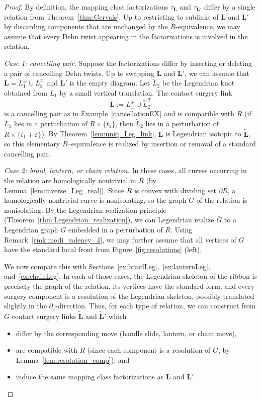 \documentclass{amsart}
\numberwithin{equation}{section}
\numberwithin{figure}{section}
\theoremstyle{definition}
\theoremstyle{remark}
\let\oldtau\tau
\renewcommand{\tau}{\oldtau}
\begin{document}
\begin{proof}
  By definition, the mapping class factorizations $\tau_{\scriptscriptstyle{\boldsymbol{L}}}$ and $\tau_{\scriptscriptstyle{\boldsymbol{L}'}}$ differ by a single relation from Theorem~\ref{thm:Gervais}. Up to restricting to sublinks of $\boldsymbol{L}$ and $\boldsymbol{L}'$ by discarding components that are unchanged by the $R$-equivalence, we may assume that every Dehn twist appearing in the factorizations is involved in the relation.

  \medskip\noindent
  \emph{Case 1: cancelling pair.}  
  Suppose the factorizations differ by inserting or deleting a pair of cancelling Dehn twists. Up to swapping $\boldsymbol{L}$ and $\boldsymbol{L}'$, we can assume that $\boldsymbol{L}=L_1^{\pm}\cup L_2^{\mp}$ and $\boldsymbol{L}'$ is the empty diagram.
Let $\widetilde{L}_2$ be the Legendrian knot obtained from $L_1$ by a small vertical translation. The contact surgery link
  \[
    \widetilde{\boldsymbol{L}} := L_1^{\pm}\cup \widetilde{L}_2^{\mp}
  \]
  is a cancelling pair as in Example~\ref{cancellationEX} and is compatible with $R$ (if $L_1$ lies in a perturbation of $R\times\{t_1\}$, then $\widetilde{L}_2$ lies in a perturbation of $R\times\{t_1+\varepsilon\}$). By Theorem~\ref{lem:uniq_Leg_link}, $\boldsymbol{L}$ is Legendrian isotopic to $\widetilde{\boldsymbol{L}}$, so this elementary $R$–equivalence is realized by insertion or removal of a standard cancelling pair.

  \medskip\noindent
  \emph{Case 2: braid, lantern, or chain relation.}  
  In these cases, all curves occurring in the relation are homologically nontrivial in $R$ (by Lemma~\ref{lem:inverse_Leg_real}). Since $R$ is convex with dividing set $\partial R$, a homologically nontrivial curve is nonisolating, so the graph $\overline{G}$ of the relation is nonisolating.  
  By the Legendrian realization principle (Theorem~\ref{thm:Legendrian_realization}), we can Legendrian realize $\overline{G}$ to a Legendrian graph $G$ embedded in a perturbation of $R$. Using Remark~\ref{rmk:modi_valency_4}, we may further assume that all vertices of $G$ have the standard local front from Figure~\ref{fig:resolutions} (left).

  We now compare this with Sections~\ref{ex:braidLeg},~\ref{ex:lanternLeg}, and~\ref{ex:chainLeg}. In each of those cases, the Legendrian skeleton of the ribbon is precisely the graph of the relation, its vertices have the standard form, and every surgery component is a resolution of the Legendrian skeleton, possibly translated slightly in the $\partial_z$-direction. Thus, for each type of relation, we can construct from $G$ contact surgery links $\widetilde{\boldsymbol{L}}$ and $\widetilde{\boldsymbol{L}}'$ which
  \begin{itemize}
    \item differ by the corresponding move (handle slide, lantern, or chain move),
    \item are compatible with $R$ (since each component is a resolution of $G$, by Lemma~\ref{lem:resolution_comp}), and
    \item induce the same mapping class factorizations as $\boldsymbol{L}$ and $\boldsymbol{L}'$.
  \end{itemize}


\end{proof}
\end{document}
